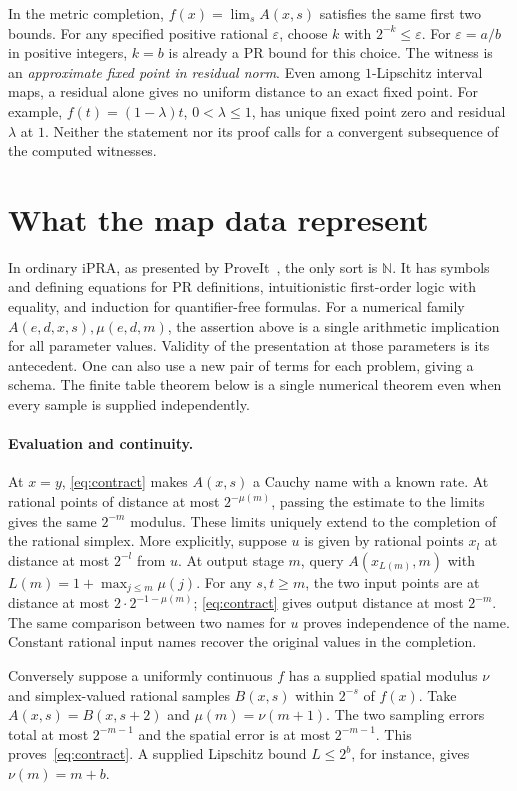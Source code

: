 \documentclass[11pt,letterpaper]{article}
\newcommand{\N}{\mathbb N}\newcommand{\Q}{\mathbb Q}
\theoremstyle{claim}\newtheorem{theorem}{Theorem}\newtheorem{lemma}[theorem]{Lemma}
\begin{document}
In the metric completion, $f(x)=\lim_s A(x,s)$ satisfies the same first two bounds.
For any specified positive rational $\varepsilon$, choose $k$ with $2^{-k}\le\varepsilon$.
For $\varepsilon=a/b$ in positive integers, $k=b$ is already a PR bound for this choice.
The witness is an \emph{approximate fixed point in residual norm}. Even among
$1$-Lipschitz interval maps, a residual alone gives no uniform distance to an exact
fixed point. For example, $f(t)=(1-\lambda)t$, $0<\lambda\le1$, has unique fixed point zero
and residual $\lambda$ at $1$. Neither the statement nor its proof calls for a
convergent subsequence of the computed witnesses.

\section{What the map data represent}\label{sec:names}
In ordinary iPRA, as presented by ProveIt~\cite{ipra}, the only sort is
$\N$. It has symbols and defining equations for PR definitions, intuitionistic
first-order logic with equality, and induction for quantifier-free formulas.
For a numerical family $A(e,d,x,s),\mu(e,d,m)$, the assertion above is a
single arithmetic implication for all parameter values. Validity of the
presentation at those parameters is its antecedent. One can also use a new pair
of terms for each problem, giving a schema. The finite table theorem below
is a single numerical theorem even when every sample is supplied independently.

\paragraph{Evaluation and continuity.}
At $x=y$, \eqref{eq:contract} makes $A(x,s)$ a Cauchy name with a known
rate. At rational points of distance at most $2^{-\mu(m)}$, passing the
estimate to the limits gives the same $2^{-m}$ modulus. These limits uniquely
extend to the completion of the rational simplex. More explicitly, suppose
$u$ is given by rational points $x_l$ at distance at most $2^{-l}$ from $u$.
At output stage $m$, query $A(x_{L(m)},m)$ with
$L(m)=1+\max_{j\le m}\mu(j)$. For any $s,t\ge m$, the two input points
are at distance at most $2\cdot2^{-1-\mu(m)}$; \eqref{eq:contract} gives
output distance at most $2^{-m}$. The same comparison between two names for
$u$ proves independence of the name. Constant rational input names
recover the original values in the completion.

Conversely suppose a uniformly continuous $f$ has a supplied spatial modulus
$\nu$ and simplex-valued rational samples $B(x,s)$ within $2^{-s}$ of $f(x)$.
Take $A(x,s)=B(x,s+2)$ and $\mu(m)=\nu(m+1)$. The two sampling errors total
at most $2^{-m-1}$ and the spatial error is at most $2^{-m-1}$.
This proves~\eqref{eq:contract}. A supplied Lipschitz bound $L\le2^b$,
for instance, gives $\nu(m)=m+b$.
\end{document}
